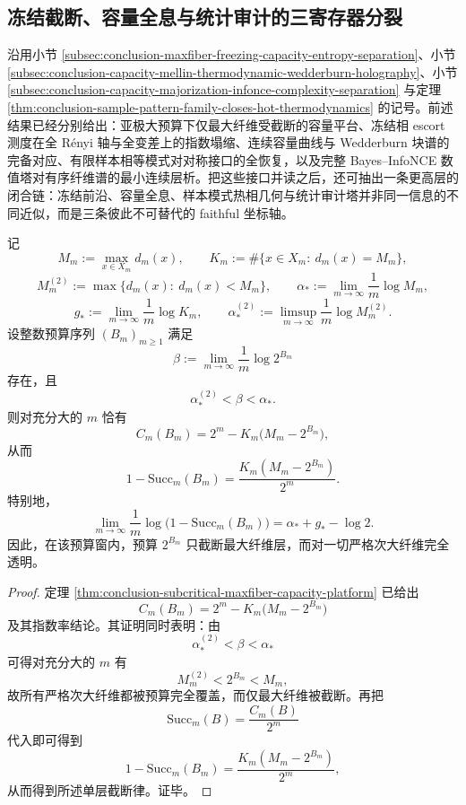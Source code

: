 \subsection{冻结截断、容量全息与统计审计的三寄存器分裂}\label{subsec:conclusion-freezing-capacity-samplepattern-audit-register-trisplitting}
沿用小节 \ref{subsec:conclusion-maxfiber-freezing-capacity-entropy-separation}、小节 \ref{subsec:conclusion-capacity-mellin-thermodynamic-wedderburn-holography}、小节 \ref{subsec:conclusion-capacity-majorization-infonce-complexity-separation} 与定理 \ref{thm:conclusion-sample-pattern-family-closes-hot-thermodynamics} 的记号。前述结果已经分别给出：亚极大预算下仅最大纤维受截断的容量平台、冻结相 escort 测度在全 Rényi 轴与全变差上的指数塌缩、连续容量曲线与 Wedderburn 块谱的完备对应、有限样本相等模式对对称接口的全恢复，以及完整 Bayes--InfoNCE 数值塔对有序纤维谱的最小连续层析。把这些接口并读之后，还可抽出一条更高层的闭合链：冻结前沿、容量全息、样本模式热相几何与统计审计塔并非同一信息的不同近似，而是三条彼此不可替代的 faithful 坐标轴。

\begin{theorem}[亚极大预算窗的单层截断律]\label{thm:conclusion-subcritical-budget-single-layer-truncation}
记
\[
M_m:=\max_{x\in X_m}d_m(x),
\qquad
K_m:=\#\{x\in X_m:\ d_m(x)=M_m\},
\]
\[
M_m^{(2)}:=\max\{d_m(x):\ d_m(x)<M_m\},
\qquad
\alpha_\ast:=\lim_{m\to\infty}\frac{1}{m}\log M_m,
\]
\[
g_\ast:=\lim_{m\to\infty}\frac{1}{m}\log K_m,
\qquad
\alpha_\ast^{(2)}:=\limsup_{m\to\infty}\frac{1}{m}\log M_m^{(2)}.
\]
设整数预算序列 \((B_m)_{m\ge 1}\) 满足
\[
\beta:=\lim_{m\to\infty}\frac{1}{m}\log 2^{B_m}
\]
存在，且
\[
\alpha_\ast^{(2)}<\beta<\alpha_\ast.
\]
则对充分大的 \(m\) 恰有
\[
C_m(B_m)=2^m-K_m\bigl(M_m-2^{B_m}\bigr),
\]
从而
\[
1-\mathrm{Succ}_m(B_m)
=
\frac{K_m(M_m-2^{B_m})}{2^m}.
\]
特别地，
\[
\lim_{m\to\infty}\frac{1}{m}\log\bigl(1-\mathrm{Succ}_m(B_m)\bigr)
=
\alpha_\ast+g_\ast-\log 2.
\]
因此，在该预算窗内，预算 \(2^{B_m}\) 只截断最大纤维层，而对一切严格次大纤维完全透明。
\end{theorem}
\begin{proof}
定理 \ref{thm:conclusion-subcritical-maxfiber-capacity-platform} 已给出
\[
C_m(B_m)=2^m-K_m\bigl(M_m-2^{B_m}\bigr)
\]
及其指数率结论。其证明同时表明：由
\[
\alpha_\ast^{(2)}<\beta<\alpha_\ast
\]
可得对充分大的 \(m\) 有
\[
M_m^{(2)}<2^{B_m}<M_m,
\]
故所有严格次大纤维都被预算完全覆盖，而仅最大纤维被截断。再把
\[
\mathrm{Succ}_m(B)=\frac{C_m(B)}{2^m}
\]
代入即可得到
\[
1-\mathrm{Succ}_m(B_m)
=
\frac{K_m(M_m-2^{B_m})}{2^m},
\]
从而得到所述单层截断律。证毕。
\end{proof}

